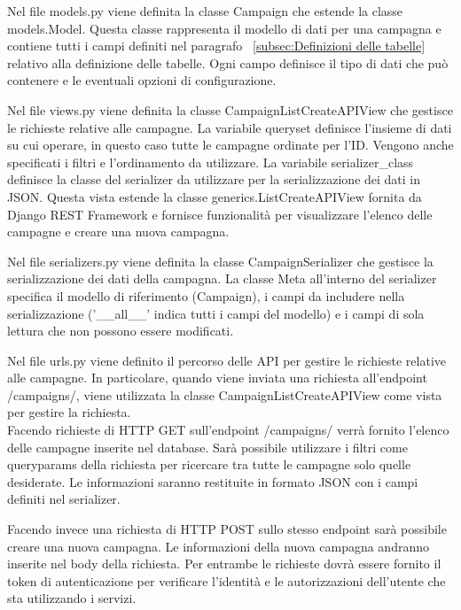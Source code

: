 

Nel file models.py viene definita la classe Campaign che estende la classe 
models.Model. Questa classe rappresenta il modello di dati per una campagna e 
contiene tutti i campi definiti nel paragrafo ~\ref{subsec:Definizioni delle tabelle} 
relativo alla definizione delle tabelle. 
Ogni campo definisce il tipo di dati che può contenere e le 
eventuali opzioni di configurazione. 

Nel file views.py viene definita la classe CampaignListCreateAPIView che 
gestisce le richieste relative alle campagne. La variabile queryset definisce 
l'insieme di dati su cui operare, in questo caso tutte le campagne ordinate per 
l'ID. Vengono anche specificati i  filtri e l’ordinamento da utilizzare. 
La variabile serializer\_class definisce la classe del serializer da utilizzare 
per la serializzazione dei dati in JSON. 
Questa vista estende la classe generics.ListCreateAPIView 
fornita da Django REST Framework e fornisce funzionalità per visualizzare 
l'elenco delle campagne e creare una nuova campagna.

Nel file serializers.py viene definita la classe CampaignSerializer che gestisce 
la serializzazione dei dati della campagna. La classe Meta all'interno del 
serializer specifica il modello di riferimento (Campaign), i campi da includere 
nella serializzazione ('\_\_all\_\_' indica tutti i campi del modello) e i campi di 
sola lettura che non possono essere modificati.

Nel file urls.py viene definito il percorso delle API per gestire le richieste 
relative alle campagne. In particolare, quando viene inviata una richiesta all'endpoint 
/campaigns/, viene utilizzata la classe CampaignListCreateAPIView come vista 
per gestire la richiesta.\\

Facendo richieste di HTTP GET sull’endpoint /campaigns/ verrà fornito l’elenco 
delle campagne inserite nel database. Sarà possibile utilizzare i filtri 
come queryparams della richiesta per 
ricercare tra tutte le campagne solo quelle desiderate. Le informazioni saranno 
restituite in formato JSON con i campi definiti nel serializer.

Facendo invece una richiesta di HTTP POST sullo stesso endpoint sarà possibile 
creare una nuova campagna. Le informazioni della nuova campagna andranno 
inserite nel body della richiesta.
Per entrambe le richieste dovrà essere fornito il token di autenticazione per 
verificare l’identità e le autorizzazioni dell’utente che sta utilizzando i 
servizi.


